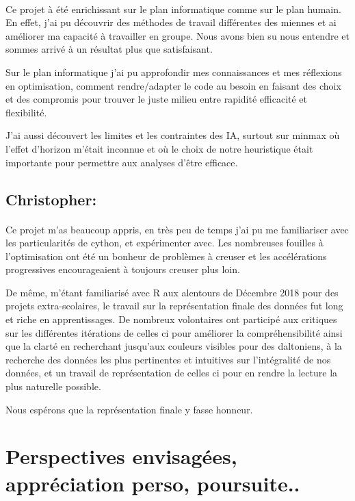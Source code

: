 \documentclass[
	headsepline=on,
	footsepline=on,
	twoside=off,
	abstract=on,
	DIV=10
]{scrreprt}
\begin{document}
				\paragraph{}
				Ce projet à été enrichissant sur le plan informatique comme sur le plan humain. En effet, j'ai pu découvrir des méthodes de travail différentes des miennes et ai améliorer ma capacité à  travailler en groupe. 
				Nous avons bien su nous entendre et sommes arrivé à un résultat plus que satisfaisant. 
				
				Sur le plan informatique j'ai pu approfondir mes connaissances et mes réflexions en optimisation, comment rendre/adapter le code au besoin en faisant des choix et des compromis pour trouver le juste milieu entre rapidité efficacité et flexibilité. 
				
				J'ai aussi découvert les limites et les contraintes des IA, surtout sur minmax où l'effet d'horizon m'était inconnue et où le choix de notre heuristique était importante pour permettre aux analyses d'être efficace.
				 
				\subsection{Christopher:} 
				\paragraph{}
				Ce projet m'as beaucoup appris, en très peu de temps j'ai pu me familiariser avec les particularités de cython, et expérimenter avec.
				Les nombreuses fouilles à l'optimisation ont été un bonheur de problèmes à creuser et les accélérations progressives encourageaient à toujours creuser plus loin.
				
				De même, m'étant familiarisé avec R aux alentours de Décembre 2018 pour des projets extra-scolaires, le travail sur la représentation finale des données fut long et riche en apprentissages.
				De nombreux volontaires ont participé aux critiques sur les différentes itérations de celles ci pour améliorer la compréhensibilité ainsi que la clarté en recherchant jusqu'aux couleurs visibles pour des daltoniens, à la recherche des données les plus pertinentes et intuitives sur l'intégralité de nos données, et un travail de représentation de celles ci pour en rendre la lecture la plus naturelle possible. 
				
				Nous espérons que la représentation finale y fasse honneur.
	 
						
			\section{Perspectives envisagées, appréciation perso, poursuite..}
\end{document}
